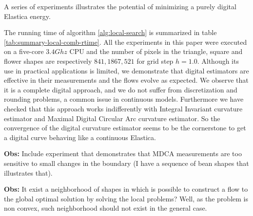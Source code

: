 		

A series of experiments  illustrates the potential of minimizing a purely digital Elastica energy. 


The running time of algorithm \ref{alg:local-search} is summarized in table \ref{tab:summary-local-comb-rtime}. All the
experiments in this paper were executed on a five-core $3.4Ghz$ CPU and the number of pixels in the triangle, square and
flower shapes are respectively $841,1867,521$ for grid step $h=1.0$. Although its use in practical applications is
limited, we demonstrate that digital estimators are effective in their measurements and the flows evolve as expected. We
observe that it is a complete digital approach, and we do not suffer from discretization and rounding problems, a common
issue in continuous models.  Furthermore we have checked that this approach works indifferently with Integral Invariant
curvature estimator and Maximal Digital Circular Arc curvature estimator. So the convergence of the digital curvature
estimator seems to be the cornerstone to get a digital curve behaving like a continuous Elastica.  


\textbf{Obs:} Include experiment that demonstrates that MDCA measurements are too sensitive to small changes in the boundary (I have a sequence of bean shapes that illustrates that).

\textbf{Obs:} It exist a neighborhood of shapes in which is possible to construct a flow to the global optimal solution by solving  the local problems? Well, as the problem is non convex, such neighborhood should not exist in the general case. 


